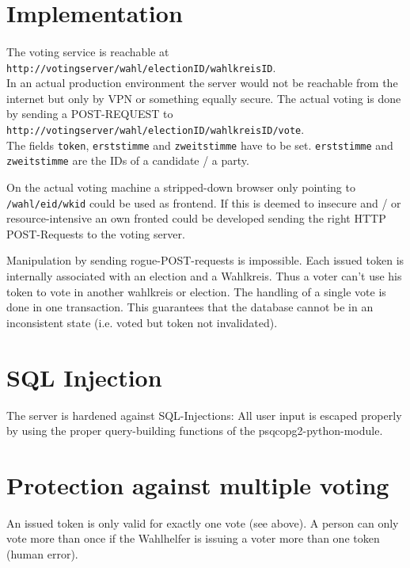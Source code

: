 \documentclass[10pt,a4paper]{article}
\begin{document}
\section*{Implementation}

\paragraph*{}
The voting service is reachable at \\
\texttt{http://votingserver/wahl/electionID/wahlkreisID}. \\
In an actual production environment the server would not be reachable from the internet but only by VPN or something equally secure. The actual voting is done by sending a POST-REQUEST to \\ \texttt{http://votingserver/wahl/electionID/wahlkreisID/vote}. \\
The fields \texttt{token}, \texttt{erststimme} and \texttt{zweitstimme} have to be set. \texttt{erststimme} and \texttt{zweitstimme} are the IDs of a candidate / a party. 

On the actual voting machine a stripped-down browser only pointing to \texttt{/wahl/eid/wkid} could be used as frontend. If this is deemed to insecure and / or resource-intensive an own fronted could be developed sending the right HTTP POST-Requests to the voting server.

Manipulation by sending rogue-POST-requests is impossible. Each issued token is internally associated with an election and a Wahlkreis. Thus a voter can't use his token to vote in another wahlkreis or election. The handling of a single vote is done in one transaction. This guarantees that the database cannot be in an inconsistent state (i.e. voted but token not invalidated).


\section*{SQL Injection}
The server is hardened against SQL-Injections: All user input is escaped properly by using the proper query-building functions of the psqcopg2-python-module.



\section*{Protection against multiple voting}
An issued token is only valid for exactly one vote (see above). A person can only vote more than once if the Wahlhelfer is issuing a voter more than one token (human error).
\end{document}
